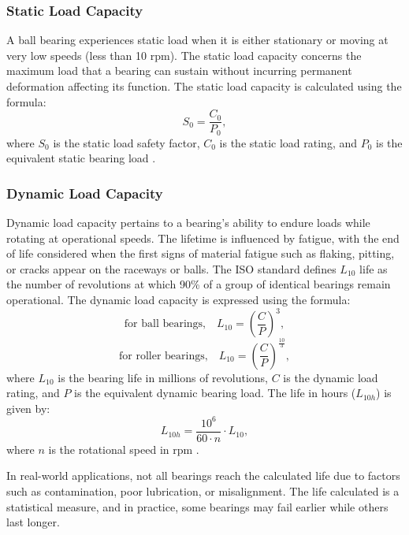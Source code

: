 \subsubsection{Static Load Capacity}
A ball bearing experiences static load when it is either stationary or moving at very low speeds (less than 10 \ac{rpm}). The static load capacity concerns the maximum load that a bearing can sustain without incurring permanent deformation affecting its function. The static load capacity is calculated using the formula:
\begin{equation}
S_{0} = \frac{C_{0}}{P_{0}},
\end{equation}
where \(S_{0}\) is the static load safety factor, \(C_{0}\) is the static load rating, and \(P_{0}\) is the equivalent static bearing load \cite[p. 570 f.]{wittel21}.

\subsubsection{Dynamic Load Capacity}
Dynamic load capacity pertains to a bearing's ability to endure loads while rotating at operational speeds. The lifetime is influenced by fatigue, with the end of life considered when the first signs of material fatigue such as flaking, pitting, or cracks appear on the raceways or balls. The ISO standard defines \(L_{10}\) life as the number of revolutions at which 90\% of a group of identical bearings remain operational. The dynamic load capacity is expressed using the formula:
\begin{equation}
\text{for ball bearings,} \quad L_{10} = \left(\frac{C}{P}\right)^3,
\end{equation}
\begin{equation}
\text{for roller bearings,} \quad L_{10} = \left(\frac{C}{P}\right)^\frac{10}{3},
\end{equation}
where \(L_{10}\) is the bearing life in millions of revolutions, \(C\) is the dynamic load rating, and \(P\) is the equivalent dynamic bearing load. The life in hours (\(L_{10h}\)) is given by:
\begin{equation}
L_{10h} = \frac{10^6}{60 \cdot n} \cdot L_{10},
\end{equation}
where \(n\) is the rotational speed in \ac{rpm} \cite[p. 571 ff.]{wittel21}.

In real-world applications, not all bearings reach the calculated life due to factors such as contamination, poor lubrication, or misalignment. The life calculated is a statistical measure, and in practice, some bearings may fail earlier while others last longer.
